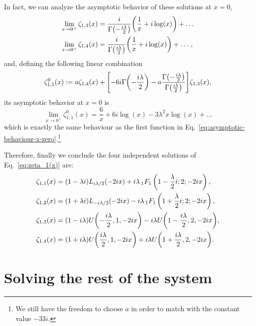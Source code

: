 \documentclass[
 aip,
 jmp,
 amsmath,amssymb,
 reprint,
 nofootinbib,
]{revtex4-2}
\begin{document}
In fact, we can analyze the asymptotic behavior of these solutions at $x = 0$,
\begin{align}
    \lim_{x \to 0^+} \zeta_{1,3}(x) & = \frac{i}{\Gamma\qty(- \frac{i \lambda}{2})} \qty(\frac{1}{x} + i \log(x)) + \dotso \\
    \lim_{x \to 0^+} \zeta_{1,4}(x) & = \frac{i}{\Gamma\qty( \frac{i \lambda}{2})} \qty(\frac{1}{x} + i \log(x)) + \dotso,
\end{align}
and, defining the following linear combination
\begin{equation}
    \zeta_{1,1}^{0}(x) := a \zeta_{1,4}(x) + \qty[- 6 i \Gamma\qty(- \frac{i \lambda}{2}) - a \frac{\Gamma\qty(- \frac{i \lambda}{2})}{\Gamma\qty( \frac{i \lambda}{2})}] \zeta_{1,3}(x),
\end{equation}
its asymptotic behavior at $x = 0$ is
\begin{equation}
    \lim_{x \to 0^+} \zeta_{1,1}^{0}(x) = \frac{6}{x} + 6 i \log(x) - 3 \lambda^2 x \log(x) + \dotso
\end{equation}
which is exactly the same behaviour as the first function in Eq.~\eqref{eq:asymptotic-behaviour-x-zero}.\footnote{We still have the freedom to choose $a$ in order to match with the constant value $- 33 i$.}

Therefore, finally we conclude the four independent solutions of Eq.~\eqref{eq:zeta_1(x)} are:
\begin{align}
\zeta_{1,1}(x) & =   (1-\lambda i)  L_{i \lambda/2}(-2 i x)+ i \lambda \, _1F_1\left(1- \frac{\lambda}2 i ;2;-2 i x \right) ,\\
\zeta_{1,2}(x) & =   (1+ \lambda i)L_{-i \lambda/2}(-2 i x) -i \lambda \, _1F_1\left(1+  \frac{\lambda}2i ;2;-2 i x \right) ,\\  
\zeta_{1,3}(x) & =  (1 - i \lambda) U\qty(- \frac{i \lambda}{2}, 1, -2 i x) - i \lambda U\qty(1 - \frac{i \lambda}{2}, 2, -2 i x),\\
\zeta_{1,4}(x) & =  (1 + i \lambda) U\qty( \frac{i \lambda}{2}, 1, -2 i x) + i \lambda U\qty(1 + \frac{i \lambda}{2}, 2, -2 i x).
\end{align}

\section{Solving the rest of the system}
\end{document}
